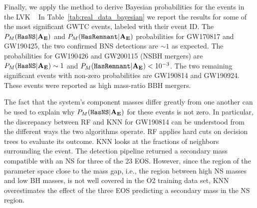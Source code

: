Finally, we apply the method to derive Bayesian probabilities for the events in the \ac{LVK} ~  In Table~\ref{tab:real_data_bayesian} we
report the results for some of the most significant \ac{GWTC} events, labeled with their event ID. The $P_M({{\tt HasNS}} |\bf{A_E})$ and $P_M({{\tt HasRemnant}} |\bf{A_E})$ probabilities for GW170817 and
GW190425, the two confirmed \ac{BNS} detections are $\sim 1$ as expected.  The probabilities for GW190426 and GW200115 (\ac{NSBH} mergers) are $P_M({{\tt HasNS}} |{\bf{A_E}}) \sim 1$ and
$P_M({{\tt HasRemnant}} |{\bf{A_E}}) < 10^{-3}$. The two remaining significant events with non-zero probabilities are GW190814 and GW190924. These events were reported as high mass-ratio BBH
mergers. 

The fact that the system's component masses differ greatly from one another can be used to explain why $P_M({{\tt HasNS}} |\bf{A_E})$ for these events is not zero. In particular, the discrepancy
between \ac{RF} and \ac{KNN} for GW190814 can be understood from the different ways the two algorithms operate. \ac{RF} applies hard cuts on decision trees to evaluate its outcome.
\ac{KNN} looks at the fractions of neighbors surrounding the event. The detection pipeline returned a secondary mass compatible with an \ac{NS} for three of the 23 \ac{EOS}. However,
since the region of the parameter space close to the mass gap, i.e., the region between high \ac{NS} masses and low \ac{BH} masses, is not well covered in the \ac{O2} training data set,
\ac{KNN} overestimates the effect of the three \ac{EOS} predicting a secondary mass in the \ac{NS} region. 

